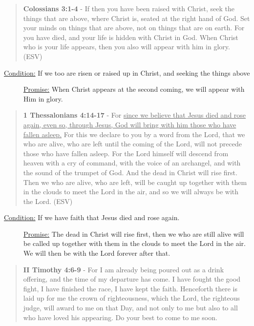 \documentclass[11pt]{article}
\begin{document}
\begin{quote}
\textbf{Colossians 3:1-4} - If then you have been raised with Christ, seek the things that are above, where Christ is, seated at the right hand of God. Set your minds on things that are above, not on things that are on earth. For you have died, and your life is hidden with Christ in God. When Christ who is your life appears, then you also will appear with him in glory. (ESV)
\end{quote}

\begin{description}
\item[{\uline{Condition:} If we too are risen or raised up in Christ, and seeking the things above}] \uline{Promise:} When Christ appears at the second coming, we will appear with Him in glory.
\end{description}

\begin{quote}
\textbf{1 Thessalonians 4:14-17} - For \uline{since we believe that Jesus died and rose again, even so, through Jesus, God will bring with him those who have fallen asleep.} For this we declare to you by a word from the Lord, that we who are alive, who are left until the coming of the Lord, will not precede those who have fallen asleep. For the Lord himself will descend from heaven with a cry of command, with the voice of an archangel, and with the sound of the trumpet of God. And the dead in Christ will rise first. Then we who are alive, who are left, will be caught up together with them in the clouds to meet the Lord in the air, and so we will always be with the Lord. (ESV)
\end{quote}

\begin{description}
\item[{\uline{Condition:} If we have faith that Jesus died and rose again.}] \uline{Promise:} The dead in Christ will rise first, then we who are still alive will be called up together with them in the clouds to meet the Lord in the air. We will then be with the Lord forever after that.
\end{description}

\begin{quote}
\textbf{II Timothy 4:6-9} - For I am already being poured out as a drink offering, and the time of my departure has come. I have fought the good fight, I have finished the race, I have kept the faith. Henceforth there is laid up for me the crown of righteousness, which the Lord, the righteous judge, will award to me on that Day, and not only to me but also to all who have loved his appearing. Do your best to come to me soon.
\end{quote}
\end{document}
